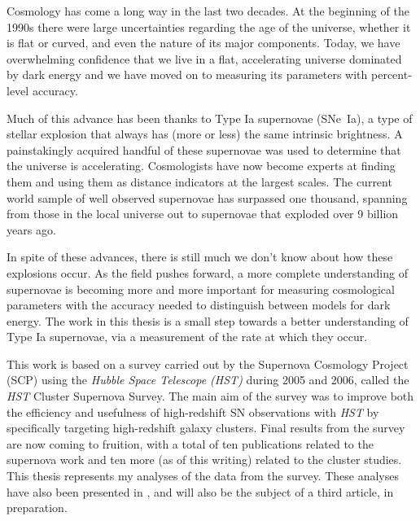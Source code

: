 
Cosmology has come a long way in the last two decades. At the
beginning of the 1990s there were large uncertainties regarding the
age of the universe, whether it is flat or curved, and even the nature
of its major components. Today, we have overwhelming confidence that
we live in a flat, accelerating universe dominated by dark energy and
we have moved on to measuring its parameters with percent-level
accuracy.

Much of this advance has been thanks to Type Ia supernovae (SNe~Ia), a
type of stellar explosion that always has (more or less) the same
intrinsic brightness. A painstakingly acquired handful of these
supernovae was used to determine that the universe is
accelerating. Cosmologists have now become experts at finding them and
using them as distance indicators at the largest scales. The current
world sample of well observed supernovae has surpassed one thousand,
spanning from those in the local universe out to supernovae that
exploded over 9 billion years ago.

In spite of these advances, there is still much we don't know about
how these explosions occur. As the field pushes forward, a more
complete understanding of supernovae is becoming more and more
important for measuring cosmological parameters with the accuracy
needed to distinguish between models for dark energy. The work in this
thesis is a small step towards a better understanding of Type Ia
supernovae, via a measurement of the rate at which they occur.

This work is based on a survey carried out by the Supernova Cosmology
Project (SCP) using the \emph{Hubble Space Telescope (HST)} during
2005 and 2006, called the \emph{HST} Cluster Supernova Survey. The
main aim of the survey was to improve both the efficiency and
usefulness of high-redshift SN observations with \emph{HST} by
specifically targeting high-redshift galaxy clusters. Final results
from the survey are now coming to fruition, with a total of ten
publications related to the supernova work and ten more (as of this
writing) related to the cluster studies. This thesis represents my
analyses of the data from the survey. These analyses have also been
presented in \citet{barbary09a,barbary11a}, and will also be the
subject of a third article, in preparation.

